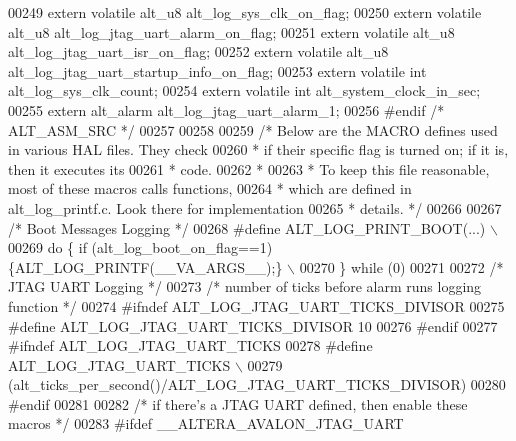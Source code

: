 \begin{DoxyCode}
{{{{00249     \textcolor{keyword}{extern} \textcolor{keyword}{volatile} alt_u8 alt\_log\_sys\_clk\_on\_flag;
00250     \textcolor{keyword}{extern} \textcolor{keyword}{volatile} alt_u8 alt\_log\_jtag\_uart\_alarm\_on\_flag;
00251     \textcolor{keyword}{extern} \textcolor{keyword}{volatile} alt_u8 alt\_log\_jtag\_uart\_isr\_on\_flag;
00252     \textcolor{keyword}{extern} \textcolor{keyword}{volatile} alt_u8 alt\_log\_jtag\_uart\_startup\_info\_on\_flag;
00253     \textcolor{keyword}{extern} \textcolor{keyword}{volatile} \textcolor{keywordtype}{int} alt\_log\_sys\_clk\_count;
00254     \textcolor{keyword}{extern} \textcolor{keyword}{volatile} \textcolor{keywordtype}{int} alt\_system\_clock\_in\_sec;
00255     \textcolor{keyword}{extern} alt_alarm alt\_log\_jtag\_uart\_alarm\_1;
00256 \textcolor{preprocessor}{#endif  }\textcolor{comment}{/* ALT\_ASM\_SRC */}\textcolor{preprocessor}{}
00257 
00258 
00259     \textcolor{comment}{/* Below are the MACRO defines used in various HAL files.  They check}
00260 \textcolor{comment}{     * if their specific flag is turned on; if it is, then it executes its }
00261 \textcolor{comment}{     * code.}
00262 \textcolor{comment}{     *}
00263 \textcolor{comment}{     * To keep this file reasonable, most of these macros calls functions,}
00264 \textcolor{comment}{     * which are defined in alt\_log\_printf.c.  Look there for implementation}
00265 \textcolor{comment}{     * details. */}
00266   
00267     \textcolor{comment}{/* Boot Messages Logging */}
00268 \textcolor{preprocessor}{    #define ALT\_LOG\_PRINT\_BOOT(...) \(\backslash\)}
00269 \textcolor{preprocessor}{       do \{ if (alt\_log\_boot\_on\_flag==1) \{ALT\_LOG\_PRINTF(\_\_VA\_ARGS\_\_);\} \(\backslash\)}
00270 \textcolor{preprocessor}{          \} while (0)}
00271 
00272     \textcolor{comment}{/* JTAG UART Logging */}
00273     \textcolor{comment}{/* number of ticks before alarm runs logging function */}
00274 \textcolor{preprocessor}{    #ifndef ALT\_LOG\_JTAG\_UART\_TICKS\_DIVISOR}
00275 \textcolor{preprocessor}{        #define ALT\_LOG\_JTAG\_UART\_TICKS\_DIVISOR 10}
00276 \textcolor{preprocessor}{    #endif}
00277 \textcolor{preprocessor}{    #ifndef ALT\_LOG\_JTAG\_UART\_TICKS}
00278 \textcolor{preprocessor}{        #define ALT\_LOG\_JTAG\_UART\_TICKS \(\backslash\)}
00279 \textcolor{preprocessor}{            (alt\_ticks\_per\_second()/ALT\_LOG\_JTAG\_UART\_TICKS\_DIVISOR)}
00280 \textcolor{preprocessor}{    #endif}
00281   
00282     \textcolor{comment}{/* if there's a JTAG UART defined, then enable these macros */}
00283 \textcolor{preprocessor}{    #ifdef \_\_ALTERA\_AVALON\_JTAG\_UART }
}}}}
\end{DoxyCode}
